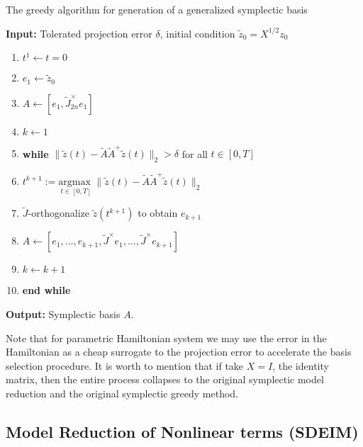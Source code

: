 \documentclass[12pt]{article}
\begin{document}
\begin{algorithm} 
\caption{The greedy algorithm for generation of a generalized symplectic basis} \label{alg:1}
{\bf Input:} Tolerated projection error $\delta$, initial condition $ \tilde z_0 = X^{1/2} z_0$
\begin{enumerate}
\item $t^1 \leftarrow t=0$
\item $e_1 \leftarrow \tilde z_0$
\item $A \leftarrow [e_1,\tilde J^{\times}_{2n}e_1]$
\item $k \leftarrow 1$
\item \textbf{while} $\| \tilde z(t) - \tilde A{\tilde A}^+\tilde z(t) \|_2 > \delta$ for all $t \in [0,T]$
\item \hspace{0.5cm} $t^{k+1} := \underset{t\in [0,T]}{\text{argmax }} \| \tilde z(t) - \tilde A{\tilde A}^+\tilde z(t) \|_2$
\item \hspace{0.5cm} $\tilde J$-orthogonalize $ \tilde z(t^{k+1})$ to obtain $e_{k+1}$
\item \hspace{0.5cm} $A \leftarrow [e_1,\dots ,e_{k+1} , \tilde J^{\times}e_1,\dots,\tilde J^{\times}e_{k+1}]$
\item \hspace{0.5cm} $k \leftarrow k+1$
\item \textbf{end while}
\end{enumerate}
\vspace{0.5cm}
{\bf Output:} Symplectic basis $A$.
\end{algorithm}

Note that for parametric Hamiltonian system we may use the error in the Hamiltonian as a cheap surrogate to the projection error to accelerate the basis selection procedure. It is worth to mention that if take $X = I$, the identity matrix, then the entire process collapses to the original symplectic model reduction and the original symplectic greedy method.

\subsection{Model Reduction of Nonlinear terms (SDEIM)}
\end{document}

